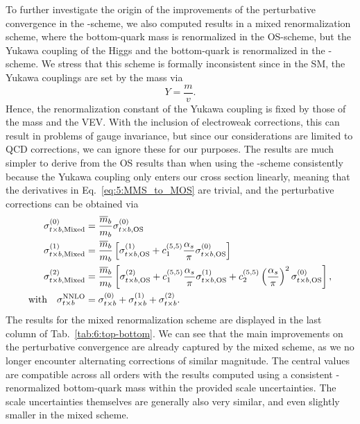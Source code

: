 To further investigate the origin of the improvements of the perturbative convergence in the \MS-scheme, we also computed results in a mixed renormalization scheme, where the bottom-quark mass is renormalized in the \acs{OS}-scheme, but the Yukawa coupling of the Higgs and the bottom-quark is renormalized in the \MS-scheme. We stress that this scheme is formally inconsistent since in the \acs{SM}, the Yukawa couplings are set by the mass via
\begin{equation}
Y = \frac{m}{v}.
\end{equation}
Hence, the renormalization constant of the Yukawa coupling is fixed by those of the mass and the \acs{VEV}. With the inclusion of electroweak corrections, this can result in problems of gauge invariance, but since our considerations are limited to \acs{QCD} corrections, we can ignore these for our purposes. The results are much simpler to derive from the \acs{OS} results than when using the \MS-scheme consistently because the Yukawa coupling only enters our cross section linearly, meaning that the derivatives in Eq.~\eqref{eq:5:MMS_to_MOS} are trivial, and the perturbative corrections can be obtained via
\begin{equation}
\begin{split}
\sigma^{(0)}_{t\times b, \text{Mixed}} &= \frac{\overline{m}_b}{m_b} \sigma^{(0)}_{t\times b, \text{OS}} \\
\sigma^{(1)}_{t \times b, \text{Mixed}} &= \frac{\overline{m}_b}{m_b} \left[ \sigma^{(1)}_{t \times b, \text{OS}} + c_1^{(5,5)} \frac{\alpha_s}{\pi} \sigma^{(0)}_{t \times b, \text{OS}} \right] \\
\sigma^{(2)}_{t \times b, \text{Mixed}} &= \frac{\overline{m}_b}{m_b} \left[ \sigma^{(2)}_{t \times b, \text{OS}} + c_1^{(5,5)} \frac{\alpha_s}{\pi} \sigma^{(1)}_{t \times b, \text{OS}} + c_2^{(5,5)} \left( \frac{\alpha_s}{\pi} \right)^2 \sigma^{(0)}_{t \times b, \text{OS}} \right], \\
\text{with} \quad \sigma^{\text{NNLO}}_{t \times b} &= \sigma^{(0)}_{t \times b} + \sigma^{(1)}_{t \times b} + \sigma^{(2)}_{t \times b}.
\end{split}
\end{equation}
The results for the mixed renormalization scheme are displayed in the last column of Tab.~\ref{tab:6:top-bottom}. We can see that the main improvements on the perturbative convergence are already captured by the mixed scheme, as we no longer encounter alternating corrections of similar magnitude. The central values are compatible across all orders with the results computed using a consistent \MS-renormalized bottom-quark mass within the provided scale uncertainties. The scale uncertainties themselves are generally also very similar, and even slightly smaller in the mixed scheme.

